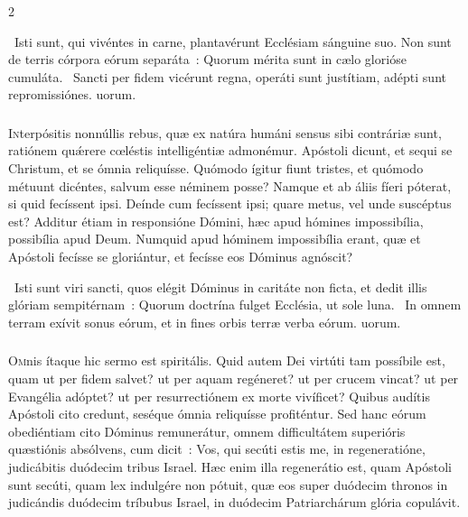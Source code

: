 \documentclass[9pt,twoside]{extarticle}
\begin{document}
\begin{multicols}{2}
{{{\begin{tightlist}{}
\item {}~Isti sunt, qui vivéntes in carne, plantavérunt Ecclésiam sánguine suo. Non sunt de terris córpora eórum separáta~: \textred{*} Quorum mérita sunt in cælo glorióse cumuláta. ~Sancti per fidem vicérunt regna, operáti sunt justítiam, adépti sunt repromissiónes. uorum.
\end{tightlist}

\subsubsection*{\center {}}
\lettrine{I}nterpósitis nonnúllis rebus, quæ ex natúra humáni sensus sibi contráriæ sunt, ratiónem quǽrere cœléstis intelligéntiæ admonémur. Apóstoli dicunt, et sequi se Christum, et se ómnia reliquísse. Quómodo ígitur fiunt tristes, et quómodo métuunt dicéntes, salvum esse néminem posse? Namque et ab áliis fíeri póterat, si quid fecíssent ipsi. Deínde cum fecíssent ipsi; quare metus, vel unde suscéptus est? Additur étiam in responsióne Dómini, hæc apud hómines impossibília, possibília apud Deum. Numquid apud hóminem impossibília erant, quæ et Apóstoli fecísse se gloriántur, et fecísse eos Dóminus agnóscit?

\begin{tightlist}{}
\item {}~Isti sunt viri sancti, quos elégit Dóminus in caritáte non ficta, et dedit illis glóriam sempitérnam~: \textred{*} Quorum doctrína fulget Ecclésia, ut sole luna. ~In omnem terram exívit sonus eórum, et in fines orbis terræ verba eórum. uorum.
\end{tightlist}

\subsubsection*{\center {}}
\lettrine{O}mnis ítaque hic sermo est spiritális. Quid autem Dei virtúti tam possíbile est, quam ut per fidem salvet? ut per aquam regéneret? ut per crucem vincat? ut per Evangélia adóptet? ut per resurrectiónem ex morte vivíficet? Quibus audítis Apóstoli cito credunt, seséque ómnia reliquísse profiténtur. Sed hanc eórum obediéntiam cito Dóminus remunerátur, omnem difficultátem superióris quæstiónis absólvens, cum dicit~: Vos, qui secúti estis me, in regeneratióne, judicábitis duódecim tribus Israel. Hæc enim illa regenerátio est, quam Apóstoli sunt secúti, quam lex indulgére non pótuit, quæ eos super duódecim thronos in judicándis duódecim tríbubus Israel, in duódecim Patriarchárum glória copulávit.

}}}
\end{multicols}
\end{document}

